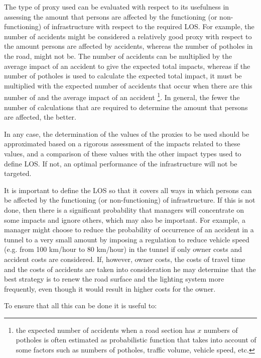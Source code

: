 The type of proxy used can be evaluated with respect to its usefulness in assessing the amount that persons are affected by the functioning (or non-functioning) of infrastructure with respect to the required LOS. For example, the number of accidents might be considered a relatively good proxy with respect to the amount persons are affected by accidents, whereas the number of potholes in the road, might not be. The number of accidents can be multiplied by the average impact of an accident to give the expected total impacts, whereas if the number of potholes is used to calculate the expected total impact, it must be multiplied with the expected number of accidents that occur when there are this number of and the average impact of an accident \footnote{the expected number of accidents when a road section has $x$ numbers of potholes is often estimated as probabilistic function that takes into account of some factors such as numbers of potholes, traffic volume, vehicle speed, etc.}. In general, the fewer the number of calculations that are required to determine the amount that persons are affected, the better.

In any case, the determination of the values of the proxies to be used should be approximated based on a rigorous assessment of the impacts related to these values, and a comparison of these values with the other impact types used to define LOS. If not, an optimal performance of the infrastructure will not be targeted.

It is important to define the LOS so that it covers all ways in which persons can be affected by the functioning (or non-functioning) of infrastructure. If this is not done, then there is a significant probability that managers will concentrate on some impacts and ignore others, which may also be important. For example, a manager might choose to reduce the probability of occurrence of an accident in a tunnel to a very small amount by imposing a regulation to reduce vehicle speed (e.g. from 100 km/hour to 80 km/hour) in the tunnel if only owner costs and accident costs are considered. If, however, owner costs, the costs of travel time and the costs of accidents are taken into consideration he may determine that the best strategy is to renew the road surface and the lighting system more frequently, even though it would result in higher costs for the owner.

To ensure that all this can be done it is useful to:

